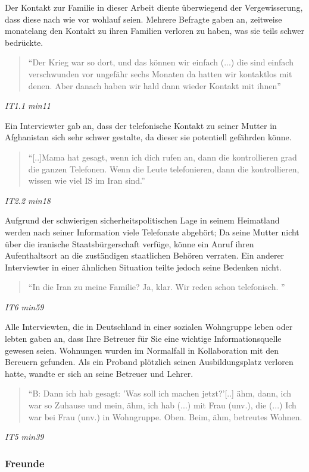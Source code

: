Der Kontakt zur Familie in dieser Arbeit diente überwiegend der Vergewisserung, dass diese nach wie vor wohlauf seien. Mehrere Befragte gaben an, zeitweise monatelang den Kontakt zu ihren Familien verloren zu haben, was sie teils schwer bedrückte.\newline
\begin{quote}
    ``Der Krieg war so dort, und das können wir einfach (...) die sind einfach verschwunden vor ungefähr sechs Monaten da hatten wir kontaktlos mit denen. Aber danach haben wir hald dann wieder Kontakt mit ihnen''
\end{quote}
\centerline{\textit{IT1.1 min11}}
Ein Interviewter gab an, dass der telefonische Kontakt zu seiner Mutter in Afghanistan sich sehr schwer gestalte, da dieser sie potentiell gefährden könne.
\begin{quote}
     ``[..]Mama hat gesagt, wenn ich dich rufen an, dann die kontrollieren grad die ganzen Telefonen. Wenn die Leute telefonieren, dann die kontrollieren, wissen wie viel IS im Iran sind.'' 
\end{quote}
\centerline{\textit{IT2.2 min18}}
 Aufgrund der schwierigen sicherheitspolitischen Lage in seinem Heimatland werden nach seiner Information viele Telefonate abgehört; Da seine Mutter nicht über die iranische Staatsbürgerschaft verfüge, könne ein Anruf ihren Aufenthaltsort an die zuständigen staatlichen Behören verraten.\newline
 Ein anderer Interviewter in einer ähnlichen Situation teilte jedoch seine Bedenken nicht.
\begin{quote}
    ``In die Iran zu meine Familie? Ja, klar. Wir reden schon telefonisch. ''
\end{quote}
\centerline{\textit{IT6 min59}}
Alle Interviewten, die in Deutschland in einer sozialen Wohngruppe leben oder lebten gaben an, dass Ihre Betreuer für Sie eine wichtige Informationsquelle gewesen seien.
Wohnungen wurden im Normalfall in Kollaboration mit den Bereuern gefunden. Als ein Proband plötzlich seinen Ausbildungsplatz verloren hatte, wandte er sich an seine Betreuer und Lehrer.
\begin{quote}
    ``B: Dann ich hab gesagt: 'Was soll ich machen jetzt?'[..] ähm, dann, ich war so Zuhause und mein, ähm, ich hab (...) mit Frau (unv.), die (...) Ich war bei Frau (unv.) in Wohngruppe. Oben. Beim, ähm, betreutes Wohnen.
\end{quote}
\centerline{\textit{IT5 min39}}

\subsubsection{Freunde}

